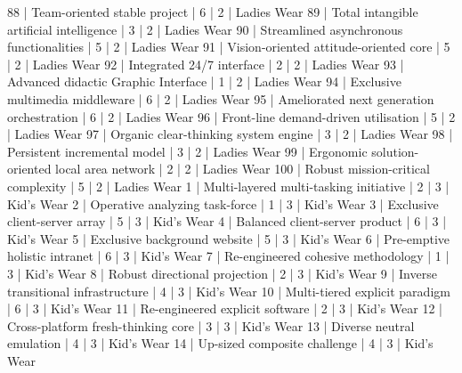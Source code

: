 \begin{enumerate}
\begin{pseudo*}
      88 | Team-oriented stable project                     |        6 |      2 | Ladies Wear   
      89 | Total intangible artificial intelligence         |        3 |      2 | Ladies Wear   
      90 | Streamlined asynchronous functionalities         |        5 |      2 | Ladies Wear   
      91 | Vision-oriented attitude-oriented core           |        5 |      2 | Ladies Wear   
      92 | Integrated 24/7 interface                        |        2 |      2 | Ladies Wear   
      93 | Advanced didactic Graphic Interface              |        1 |      2 | Ladies Wear   
      94 | Exclusive multimedia middleware                  |        6 |      2 | Ladies Wear   
      95 | Ameliorated next generation orchestration        |        6 |      2 | Ladies Wear   
      96 | Front-line demand-driven utilisation             |        5 |      2 | Ladies Wear   
      97 | Organic clear-thinking system engine             |        3 |      2 | Ladies Wear   
      98 | Persistent incremental model                     |        3 |      2 | Ladies Wear   
      99 | Ergonomic solution-oriented local area network   |        2 |      2 | Ladies Wear   
     100 | Robust mission-critical complexity               |        5 |      2 | Ladies Wear   
       1 | Multi-layered multi-tasking initiative           |        2 |      3 | Kid's Wear    
       2 | Operative analyzing task-force                   |        1 |      3 | Kid's Wear    
       3 | Exclusive client-server array                    |        5 |      3 | Kid's Wear    
       4 | Balanced client-server product                   |        6 |      3 | Kid's Wear    
       5 | Exclusive background website                     |        5 |      3 | Kid's Wear    
       6 | Pre-emptive holistic intranet                    |        6 |      3 | Kid's Wear    
       7 | Re-engineered cohesive methodology               |        1 |      3 | Kid's Wear    
       8 | Robust directional projection                    |        2 |      3 | Kid's Wear    
       9 | Inverse transitional infrastructure              |        4 |      3 | Kid's Wear    
      10 | Multi-tiered explicit paradigm                   |        6 |      3 | Kid's Wear    
      11 | Re-engineered explicit software                  |        2 |      3 | Kid's Wear    
      12 | Cross-platform fresh-thinking core               |        3 |      3 | Kid's Wear    
      13 | Diverse neutral emulation                        |        4 |      3 | Kid's Wear    
      14 | Up-sized composite challenge                     |        4 |      3 | Kid's Wear    

\end{pseudo*}
\end{enumerate}
